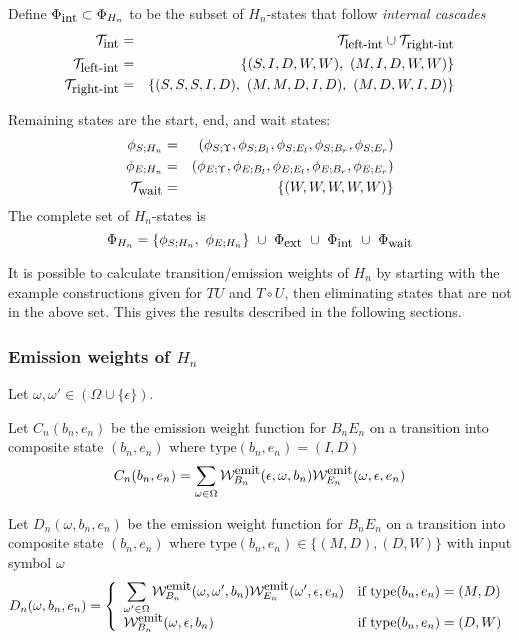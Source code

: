 \documentclass{article}
\newcommand\gappedalphabet[1]{(\Omega_{#1} \cup \{\epsilon\})}
\newcommand\compose{}
\newcommand\fork{\circ}
\newcommand\idfork{\Upsilon}
\newcommand\States{\Phi}
\newcommand\statesof[1]{\States_{#1}}
\newcommand\startstateof[1]{\phi_{S;#1}}
\newcommand\laststateof[1]{\phi_{E;#1}}
\newcommand\weight{{\cal W}}
\newcommand\weightfunof[1]{\weight_{#1}}
\newcommand\emitweightfun[1]{\weightfunof{#1}^{\mbox{\small emit}}}
\newcommand\statetype{\mbox{type}}
\newcommand\typeset[1]{{\cal T}_{\mbox{\small #1}}}
\newcommand\stateset[1]{\statesof{\mbox{\small #1}}}
\newcommand\externalsuffix{ext}
\newcommand\internalsuffix{int}
\newcommand\leftsuffix{left-int}
\newcommand\rightsuffix{right-int}
\newcommand\waitsuffix{wait}
\newcommand\externalcascades{\stateset{\externalsuffix}}
\newcommand\internalcascades{\stateset{\internalsuffix}}
\newcommand\waitstates{\stateset{\waitsuffix}}
\newcommand\internaltypes{\typeset{\internalsuffix}}
\newcommand\lefttypes{\typeset{\leftsuffix}}
\newcommand\righttypes{\typeset{\rightsuffix}}
\newcommand\waittypes{\typeset{\waitsuffix}}
\begin{document}
Define $\internalcascades \subset \statesof{H_n}$ to be the subset of $H_n$-states that follow {\em internal cascades}
\begin{eqnarray*}
\internaltypes & = & \lefttypes \cup \righttypes \\
\lefttypes & = & \{ (S,I,D,W,W),\ (M,I,D,W,W) \} \\
\righttypes & =  & \{ (S,S,S,I,D),\ (M,M,D,I,D),\ (M,D,W,I,D) \}
\end{eqnarray*}

Remaining states are the start, end, and wait states:
\begin{eqnarray*}
\startstateof{H_n} & = & (\startstateof{\idfork},\startstateof{B_l},\startstateof{E_l},\startstateof{B_r},\startstateof{E_r}) \\
\laststateof{H_n} & = & (\laststateof{\idfork},\laststateof{B_l},\laststateof{E_l},\laststateof{B_r},\laststateof{E_r}) \\
\waittypes & = & \{ (W,W,W,W,W) \}
\end{eqnarray*}
The complete set of $H_n$-states is
\[
\statesof{H_n} = \{ \startstateof{H_n},\ \laststateof{H_n} \}\ \cup\ \externalcascades\ \cup\ \internalcascades\ \cup\ \waitstates
\]

It is possible to calculate transition/emission weights of $H_n$
by starting with the example constructions given for $T \compose U$ and $T \fork U$,
then eliminating states that are not in the above set.
This gives the results described in the following sections.

\subsubsection{Emission weights of $H_n$}

Let $\omega,\omega' \in \gappedalphabet{}$.

Let $C_n(b_n,e_n)$ be the emission weight function for $B_n \compose E_n$ on a transition into composite state $(b_n,e_n)$ where $\statetype(b_n,e_n)=(I,D)$
\[
C_n(b_n,e_n) = \sum_{\omega \in \Omega} \emitweightfun{B_n}(\epsilon,\omega,b_n) \emitweightfun{E_n}(\omega,\epsilon,e_n)
\]

Let $D_n(\omega,b_n,e_n)$ be the emission weight function for $B_n \compose E_n$ on a transition into composite state $(b_n,e_n)$
 where $\statetype(b_n,e_n) \in \{(M,D),(D,W)\}$ with input symbol $\omega$ 
\[
D_n(\omega,b_n,e_n) = \left\{
\begin{array}{ll}
\displaystyle
\sum_{\omega' \in \Omega} \emitweightfun{B_n}(\omega,\omega',b_n) \emitweightfun{E_n}(\omega',\epsilon,e_n)
 & \mbox{if $\statetype(b_n,e_n)=(M,D)$} \\
\emitweightfun{B_n}(\omega,\epsilon,b_n)
 & \mbox{if $\statetype(b_n,e_n)=(D,W)$}
\end{array}
\right.
\]
\end{document}
